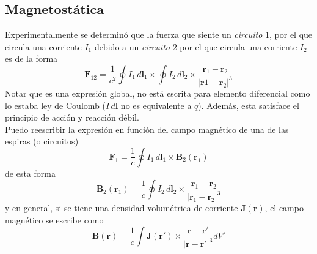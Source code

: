 \subsection{Magnetostática}
Experimentalmente se determinó que la fuerza que siente un \textit{circuito} $1$, por el que circula una corriente $I_{1}$ debido a un \textit{circuito} $2$ por el que circula una corriente $I_{2}$ es de la forma
\begin{equation}
    \textbf{F}_{12} = \frac{1}{c^{2}}
    \oint I_{1}\,d\textbf{l}_{1}\times 
    \oint I_{2}\,d\textbf{l}_{2}\times 
    \frac{\textbf{r}_{1}-\textbf{r}_{2}}{|\textbf{r}1-\textbf{r}_{2}|^{3}}
        \label{ec:LeydeAmpere}
\end{equation}
Notar que es una expresión global, no está escrita para elemento diferencial como lo estaba ley de Coulomb ($I\,d\textbf{l}$ no es equivalente a $q$). Además, esta satisface el principio de acción y reacción débil.\\
\indent Puedo reescribir la expresión en función del campo magnético de una de las espiras (o circuitos)
\begin{equation*}
    \textbf{F}_{1} = \frac{1}{c}\oint I_{1}\,d\textbf{l}_{1}\times \textbf{B}_{2}(\textbf{r}_{1})
\end{equation*}
de esta forma
\begin{equation}
    \textbf{B}_{2}(\textbf{r}_{1})
    = \frac{1}{c}\oint I_{2}\,d\textbf{l}_{2}\times 
    \frac{\textbf{r}_{1}-\textbf{r}_{2}}{|\textbf{r}_{1}-\textbf{r}_{2}|^{3}}
        \label{ec:CampoMagnético}
\end{equation}
y en general, si se tiene una densidad volumétrica de corriente $\textbf{J}(\textbf{r})$, el campo magnético se escribe como
\begin{equation}
    \textbf{B}(\textbf{r})
    = \frac{1}{c}\int \textbf{J}(\textbf{r}')\times 
    \frac{\textbf{r}-\textbf{r}'}{|\textbf{r}-\textbf{r}'|^{3}} dV'
        \label{ec:CampoMagnéticoGeneral}
\end{equation}


